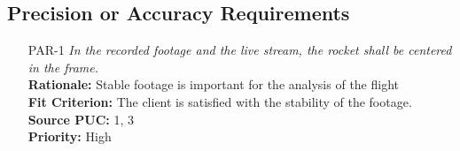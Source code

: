 \documentclass[12pt]{article}
\begin{document}
\subsection{Precision or Accuracy Requirements}
\begin{itemize}[leftmargin=*]
  \item[PAR-1] \emph{In the recorded footage and the live stream, the rocket shall be
          centered in the frame.}\\[2mm]
        \textbf{Rationale:} Stable footage is important for the analysis of the flight\\
        \textbf{Fit Criterion:} The client is satisfied with the stability of the footage.\\
        \textbf{Source PUC:} 1, 3 \\
        \textbf{Priority:} High
\end{itemize}
\end{document}
